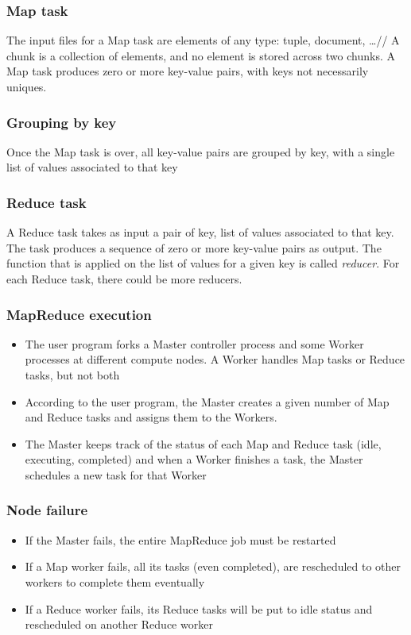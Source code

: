 \documentclass[\main/main.tex]{subfiles}
\begin{document}
\subsubsection{Map task}
The input files for a Map task are elements of any type: tuple, document, \dots //
A chunk is a collection of elements, and no element is stored across two chunks. 
A Map task produces zero or more key-value pairs, with keys not necessarily uniques.
\subsubsection{Grouping by key}
Once the Map task is over, all key-value pairs are grouped by key, with a single list of values associated to that key
\subsubsection{Reduce task}
A Reduce task takes as input a pair of key, list of values associated to that key. The task produces a sequence of zero or more key-value pairs as output. The function that is applied on the list of values for a given key is called \textit{reducer}. For each Reduce task, there could be more reducers.
\subsubsection{MapReduce execution}
\begin{itemize}
    \item The user program forks a Master controller process and some Worker processes at different compute nodes. A Worker handles Map tasks or Reduce tasks, but not both
    \item According to the user program, the Master creates a given number of Map and Reduce tasks and assigns them to the Workers. 
    \item The Master keeps track of the status of each Map and Reduce task (idle, executing, completed) and when a Worker finishes a task, the Master schedules a new task for that Worker
\end{itemize}
\subsubsection{Node failure}
\begin{itemize}
    \item If the Master fails, the entire MapReduce job must be restarted
    \item If a Map worker fails, all its tasks (even completed), are rescheduled to other workers to complete them eventually
    \item If a Reduce worker fails, its Reduce tasks will be put to idle status and rescheduled on another Reduce worker
\end{itemize}
\end{document}
